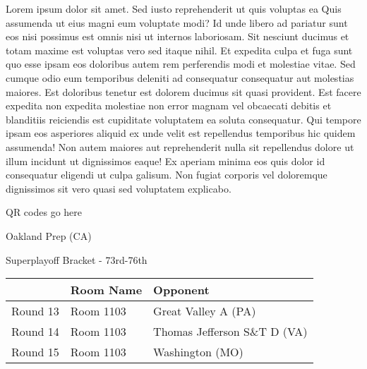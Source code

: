 \documentclass{article}%
\begin{document}
\vspace*{8pt}%
\linebreak%
\newline%
\newline%
Lorem ipsum dolor sit amet. Sed iusto reprehenderit ut quis voluptas ea Quis assumenda ut eius magni eum voluptate modi? Id unde libero ad pariatur sunt eos nisi possimus est omnis nisi ut internos laboriosam. Sit nesciunt ducimus et totam maxime est voluptas vero sed itaque nihil. Et expedita culpa et fuga sunt quo esse ipsam eos doloribus autem rem perferendis modi et molestiae vitae.\newline%
\newline%
Sed cumque odio eum temporibus deleniti ad consequatur consequatur aut molestias maiores. Est doloribus tenetur est dolorem ducimus sit quasi provident. Est facere expedita non expedita molestiae non error magnam vel obcaecati debitis et blanditiis reiciendis est cupiditate voluptatem ea soluta consequatur. Qui tempore ipsam eos asperiores aliquid ex unde velit est repellendus temporibus hic quidem assumenda!\newline%
\newline%
Non autem maiores aut reprehenderit nulla sit repellendus dolore ut illum incidunt ut dignissimos eaque! Ex aperiam minima eos quis dolor id consequatur eligendi ut culpa galisum. Non fugiat corporis vel doloremque dignissimos sit vero quasi sed voluptatem explicabo.\newline%
\newline%
%
\vspace*{30pt}%
\begin{center}%
\begin{Huge}%
QR codes go here%
\end{Huge}%
\end{center}%
\newpage%
\begin{center}%
\begin{Huge}%
Oakland Prep (CA)%
\end{Huge}%
\vspace*{8pt}%
\linebreak%
\begin{Large}%
Superplayoff Bracket {-} 73rd{-}76th%
\end{Large}%
\end{center}%
%
\begin{tabularx}{\textwidth}{|c|Y|Y|}%
\hline%
&Room Name&Opponent\\%
\hline%
Round 13&Room 1103&Great Valley A (PA)\\%
Round 14&Room 1103&Thomas Jefferson S\&T D (VA)\\%
Round 15&Room 1103&Washington (MO)\\%
\hline%
\end{tabularx}%
\end{document}
